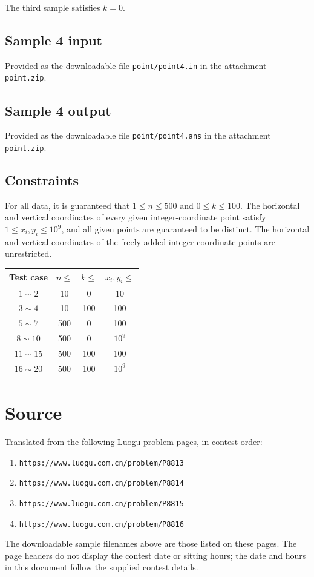 \documentclass[11pt]{article}
\begin{document}
The third sample satisfies $k=0$.

\subsection*{Sample 4 input}
Provided as the downloadable file \texttt{point/point4.in}
in the attachment \texttt{point.zip}.

\subsection*{Sample 4 output}
Provided as the downloadable file \texttt{point/point4.ans}
in the attachment \texttt{point.zip}.

\subsection*{Constraints}
For all data, it is guaranteed that $1\leq n\leq 500$ and
$0\leq k\leq 100$.
The horizontal and vertical coordinates of every given
integer-coordinate point satisfy $1\leq x_i,y_i\leq 10^9$,
and all given points are guaranteed to be distinct.
The horizontal and vertical coordinates of the freely added
integer-coordinate points are unrestricted.

\begin{center}
\begin{tabular}{cccc}
\toprule
Test case & $n\leq$ & $k\leq$ & $x_i,y_i\leq$ \\
\midrule
$1\sim 2$ & 10 & 0 & 10 \\
$3\sim 4$ & 10 & 100 & 100 \\
$5\sim 7$ & 500 & 0 & 100 \\
$8\sim 10$ & 500 & 0 & $10^9$ \\
$11\sim 15$ & 500 & 100 & 100 \\
$16\sim 20$ & 500 & 100 & $10^9$ \\
\bottomrule
\end{tabular}
\end{center}

\section*{Source}
Translated from the following Luogu problem pages, in contest order:
\begin{enumerate}
\item \texttt{https://www.luogu.com.cn/problem/P8813}
\item \texttt{https://www.luogu.com.cn/problem/P8814}
\item \texttt{https://www.luogu.com.cn/problem/P8815}
\item \texttt{https://www.luogu.com.cn/problem/P8816}
\end{enumerate}
The downloadable sample filenames above are those listed on these pages.
The page headers do not display the contest date or sitting hours;
the date and hours in this document follow the supplied contest details.
\end{document}
